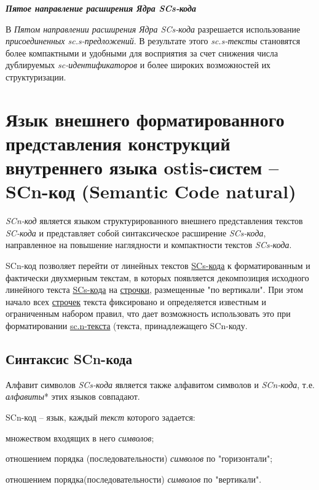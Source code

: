 \textbf{\textit{Пятое направление расширения Ядра SCs-кода}}

В \textit{Пятом направлении расширения Ядра SCs-кода} разрешается использование \textit{присоединенных \mbox{sc.s-предложений}}. В результате этого \textit{sc.s-тексты} становятся более компактными и удобными для восприятия за счет снижения числа дублируемых \textit{sc-идентификаторов} и более широких возможностей их структуризации.

\section{Язык внешнего форматированного представления конструкций внутреннего языка ostis-систем -- SCn-код (Semantic Code natural)}
\label{sec_scn}

\begin{SCn}
\end{SCn}

\textit{SCn-код} является языком структурированного внешнего представления текстов \textit{SC-кода} и представляет собой синтаксическое расширение \textit{SCs-кода}, направленное на повышение наглядности и компактности текстов \textit{SCs-кода}. 

SCn-код позволяет перейти от линейных текстов \uline{SCs-кода} к форматированным и фактически двухмерным текстам, в которых появляется декомпозиция исходного линейного текста \uline{SCs-кода} на \uline{строчки}, размещенные "по вертикали"{}. При этом начало всех \uline{строчек} текста фиксировано и определяется известным и ограниченным набором правил, что дает возможность использовать это при форматировании \uline{sc.n-текста} (текста, принадлежащего SCn-коду.

\subsection{Синтаксис SCn-кода}

Алфавит символов \textit{SCs-кода} является также алфавитом символов и \textit{SCn-кода}, т.е. \textit{алфавиты}* этих языков совпадают.

SCn-код -- язык, каждый \textit{текст} которого задается:
\begin{textitemize}
	\item множеством входящих в него \textit{символов};
	\item отношением порядка (последовательности) \textit{символов} по "горизонтали"{};
	\item отношением порядка(последовательности) \textit{символов} по "вертикали"{}.
\end{textitemize}

